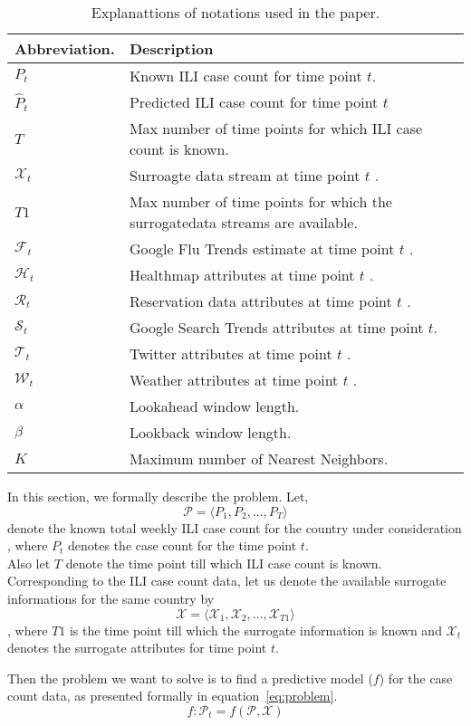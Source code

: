 
\begin{table*}[t!]
  \centering
  \begin{tabular}{|*{2}{l|}}
    \hline
    Abbreviation. & Description \\
    \hline \hline
    ${P}_t$         & Known ILI case count for time point $t$.\\
    $\hat{P}_t$     & Predicted ILI case count for time point $t$ \\
    $T$             & Max number of time points for which ILI case count is known.\\
    $\mathcal{X}_t$ & Surroagte data stream at time point $t$ .\\
    $T1$            & Max number of time points for which the surrogatedata streams are available.\\
    $\mathcal{F}_t$ & Google Flu Trends estimate at time point $t$ .\\
    $\mathcal{H}_t$ & Healthmap attributes at time point $t$ .\\
    $\mathcal{R}_t$ & Reservation data attributes at time point $t$ .\\
    $\mathcal{S}_t$ & Google Search Trends attributes at time point $t$.\\
    $\mathcal{T}_t$ & Twitter attributes at time point $t$ .\\
    $\mathcal{W}_t$ & Weather attributes at time point $t$ .\\
    $\alpha$        & Lookahead window length.\\
    $\beta$         & Lookback window length.\\
    $K$             & Maximum number of Nearest Neighbors.\\
    \hline
  \end{tabular}
  \caption{\label{tb:notations} Explanattions of notations used in the paper.
  }
\end{table*}

In this section, we formally describe the problem.
Let,  
\[\mathcal{P} = \langle {P}_1, {P}_2, \dots,{P}_T \rangle\]
denote the known total weekly ILI case count for the country under
consideration , where ${P}_t$  denotes the case count for
the time point $t$.\\
Also let $T$ denote the time point till which ILI case count is known.
Corresponding to the ILI case count data, let us denote the available surrogate informations
for the same country by 
\[\mathcal{X} = \langle \mathcal{X}_1, \mathcal{X}_2, \dots, \mathcal{X}_{T1}\rangle\]
, where $T1$ is the time point till which the surrogate
information is known and $\mathcal{X}_{t}$ denotes the surrogate attributes for time
point $t$. 

Then the problem we want to solve is to find a predictive model ($f$)  for the 
case count data, as presented formally in equation~\ref{eq:problem}.
\begin{equation}
  \label{eq:problem}
  f: \mathcal{P}_t = f\left(\mathcal{P}, \mathcal{X}\right)
\end{equation}


